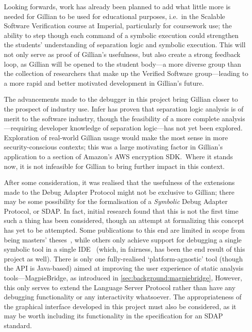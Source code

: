 Looking forwards, work has already been planned to add what little more is
needed for Gillian to be used for educational purposes, i.e.\ in the Scalable
Software Verification course at Imperial, particularly for coursework use; the
ability to step though each command of a symbolic execution could strengthen the
students' understanding of separation logic and symbolic execution. This will
not only serve as proof of Gillian's usefulness, but also create a strong
feedback loop, as Gillian will be opened to the student body---a more diverse
group than the collection of researchers that make up the Verified Software
group---leading to a more rapid and better motivated development in Gillian's
future.

The advancements made to the debugger in this project bring Gillian closer
to the prospect of industry use. Infer has proven that separation logic analysis
is of merit to the software industry, though the feasibility of a more complete
analysis---requiring developer knowledge of separation logic---has not yet
been explored. Exploration of real-world Gillian usage would make the most sense
in more security-conscious contexts; this was a large motivating factor in
Gillian's application to a section of Amazon's AWS encryption SDK.\ Where it
stands now, it is not infeasible for Gillian to bring further impact in this context. %

After some consideration, it was realised that the usefulness of the extensions
made to the Debug Adapter Protocol might not be exclusive to Gillian; there may
be some possibility for the formalisation of a \textit{Symbolic} Debug Adapter
Protocol, or SDAP. In fact, initial research found that this is not the first
time such a thing has been considered, though an attempt at formalizing this
concept has yet to be attempted. Some publications to this end are limited in
scope from being masters' theses~\cite{sdap-aurecchia}, while others only
achieve support for debugging a single symbolic tool in a single
IDE~\cite{sdap-colombo, sdap-kps} (which, in fairness, has been the end result
of this project as well).
There is only one fully-realised `platform-agnostic' tool (though the API is
Java-based) aimed at improving the user experience of static analysis tools---MagpieBridge, as introduced in \autoref{sec:background:magpiebridge},
However, this only serves to extend the Language Server Protocol rather than
have any debugging functionality or any interactivity whatsoever.
The appropriateness of the graphical interface developed in this project must
also be considered, as it may be worth including its functionality in the
specification for an SDAP standard.
